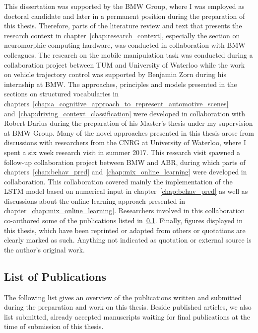 This dissertation was supported by the \ac{BMW} Group, where I was employed as doctoral candidate and later in a permanent position during the preparation of this thesis.
Therefore, parts of the literature review and text that presents the research context in chapter~\ref{chap:research_context}, especially the section on neuromorphic computing hardware, was conducted in collaboration with \ac{BMW} colleagues.
The research on the mobile manipulation task was conducted during a collaboration project between \ac{TUM} and University of Waterloo while the work on vehicle trajectory control was supported by Benjamin Zorn during his internship at \ac{BMW}.
The approaches, principles and models presented in the sections on structured vocabularies in chapters~\ref{chap:a_cognitive_approach_to_represent_automotive_scenes} and~\ref{chap:driving_context_classification} were developed in collaboration with Robert Darius during the preparation of his Master's thesis \parencite{Darius2018} under my supervision at \ac{BMW} Group.
Many of the novel approaches presented in this thesis arose from discussions with researchers from the \ac{CNRG} at University of Waterloo, where I spent a six week research visit in summer 2017.
This research visit spawned a follow-up collaboration project between \ac{BMW} and \ac{ABR}, during which parts of chapters~\ref{chap:behav_pred} and~\ref{chap:mix_online_learning} were developed in collaboration.
This collaboration covered mainly the implementation of the \ac{LSTM} model based on numerical input in chapter~\ref{chap:behav_pred} as well as discussions about the online learning approach presented in chapter~\ref{chap:mix_online_learning}.
Researchers involved in this collaboration co-authored some of the publications listed in~\ref{subsec:list_of_publications}.
Finally, figures displayed in this thesis, which have been reprinted or adapted from others or quotations are clearly marked as such.
Anything not indicated as quotation or external source is the author's original work.

\subsection{List of Publications}%
\label{subsec:list_of_publications}

The following list gives an overview of the publications written and submitted during the preparation and work on this thesis.
Beside published articles, we also list submitted, already accepted manuscripts waiting for final publications at the time of submission of this thesis.

